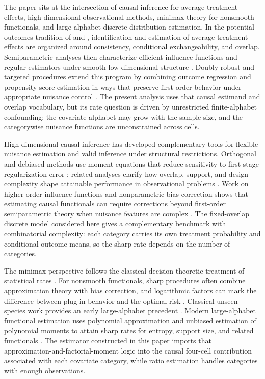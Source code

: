 \documentclass[11pt]{article}
\begin{document}
The paper sits at the intersection of causal inference for average treatment effects, high-dimensional observational methods, minimax theory for nonsmooth functionals, and large-alphabet discrete-distribution estimation. In the potential-outcomes tradition of \citet{Rubin1974} and \citet{RosenbaumRubin1983}, identification and estimation of average treatment effects are organized around consistency, conditional exchangeability, and overlap. Semiparametric analyses then characterize efficient influence functions and regular estimators under smooth low-dimensional structure \citep{Hahn1998,HiranoImbensRidder2003,RobinsRotnitzkyZhao1994}. Doubly robust and targeted procedures extend this program by combining outcome regression and propensity-score estimation in ways that preserve first-order behavior under appropriate nuisance control \citep{BangRobins2005,VanDerLaanRubin2006}. The present analysis uses that causal estimand and overlap vocabulary, but its rate question is driven by unrestricted finite-alphabet confounding: the covariate alphabet may grow with the sample size, and the categorywise nuisance functions are unconstrained across cells.

High-dimensional causal inference has developed complementary tools for flexible nuisance estimation and valid inference under structural restrictions. Orthogonal and debiased methods use moment equations that reduce sensitivity to first-stage regularization error \citep{Belloni2017,Chernozhukov2018,Chernozhukov2022}; related analyses clarify how overlap, support, and design complexity shape attainable performance in observational problems \citep{DAmour2021,JinSyrgkanis2025}. Work on higher-order influence functions and nonparametric bias correction shows that estimating causal functionals can require corrections beyond first-order semiparametric theory when nuisance features are complex \citep{Robins2008,Robins2009,Robins2017,LiuMukherjeeNeweyRobins2017,Kennedy2024}. The fixed-overlap discrete model considered here gives a complementary benchmark with combinatorial complexity: each category carries its own treatment probability and conditional outcome means, so the sharp rate depends on the number of categories.

The minimax perspective follows the classical decision-theoretic treatment of statistical rates \citep{Bickel1993,VanDerVaart1998,Tsybakov2009}. For nonsmooth functionals, sharp procedures often combine approximation theory with bias correction, and logarithmic factors can mark the difference between plug-in behavior and the optimal risk \citep{Lepski1999,CaiLow2011}. Classical unseen-species work provides an early large-alphabet precedent \citep{Fisher1943,GoodToulmin1956,EfronThisted1976}. Modern large-alphabet functional estimation uses polynomial approximation and unbiased estimation of polynomial moments to attain sharp rates for entropy, support size, and related functionals \citep{Paninski2003,Valiant2011,Valiant2017,Orlitsky2016,WuYang2019,JiaoVenkatHanWeissman2015,WuYang2016,HanJiaoWeissman2015,HanJiaoWeissman2020}. The estimator constructed in this paper imports that approximation-and-factorial-moment logic into the causal four-cell contribution associated with each covariate category, while ratio estimation handles categories with enough observations.
\end{document}
